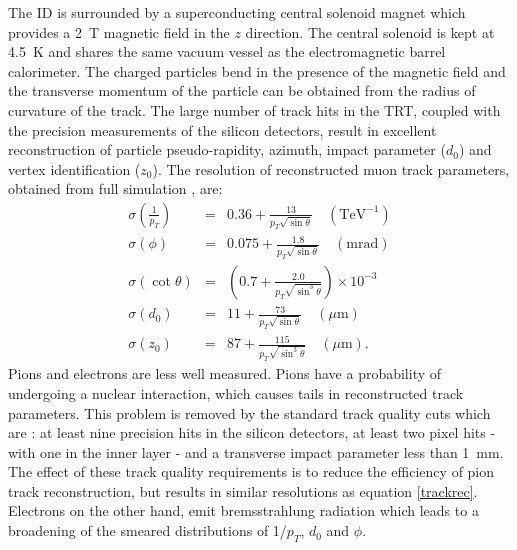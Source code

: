 The ID is surrounded by a superconducting central solenoid magnet which provides a 2~T magnetic field in the $z$ direction. The central solenoid is kept at 4.5~K and shares the same vacuum vessel as the electromagnetic barrel calorimeter. The charged particles bend in the presence of the magnetic field and the transverse momentum of the particle can be obtained from the radius of curvature of the track. The large number of track hits in the TRT, coupled with the precision measurements of the silicon detectors, result in excellent reconstruction of particle pseudo-rapidity, azimuth, impact parameter ($d_0$) and vertex identification ($z_0$). The resolution of reconstructed muon track parameters, obtained from full simulation \cite{:1999fq:Chapter3}, are:
\begin{eqnarray} \label{trackrec}
\sigma\left(\frac{1}{p_T} \right) & = & 0.36 + \frac{13}{p_T\sqrt{\sin\theta}} \quad(\text{TeV}^{-1})  \nonumber \\
\sigma\left(\phi \right) & = & 0.075 + \frac{1.8}{p_T\sqrt{\sin\theta}} \quad(\text{mrad}) \nonumber \\
\sigma\left(\cot\theta\right) & = &  \left(0.7 +  \frac{2.0}{p_T\sqrt{\sin^{3}\theta}}\right)\times10^{-3} \nonumber \\
\sigma\left(d_0\right) & = & 11 + \frac{73}{p_T\sqrt{\sin\theta}} \quad (\mu\text{m}) \nonumber \\
\sigma\left(z_0\right) & = & 87 + \frac{115}{p_T\sqrt{\sin^3\theta}} \quad (\mu\text{m}).
\end{eqnarray}
Pions and electrons are less well measured. Pions have a probability of undergoing a nuclear interaction, which causes tails in reconstructed track parameters. This problem is removed by the standard track quality cuts which are \cite{:1999fq:Chapter3}: at least nine precision hits in the silicon detectors, at least two pixel hits - with one in the inner layer - and a transverse impact parameter less than 1~mm.  The effect of these track quality requirements is to reduce the efficiency of pion track reconstruction, but results in similar resolutions as equation \ref{trackrec}. Electrons on the other hand, emit bremsstrahlung
radiation which leads to a broadening of the smeared distributions of 1/$p_T$, $d_0$ and $\phi$.

